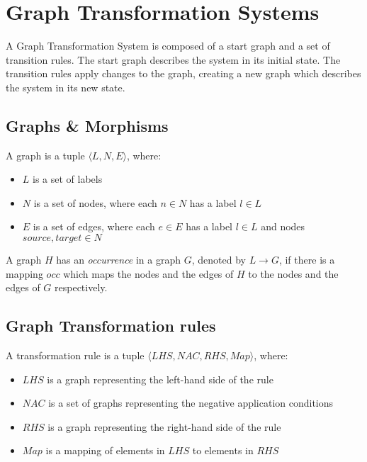 \section{Graph Transformation Systems}\label{sec:graph}
A Graph Transformation System is composed of a start graph and a set of transition rules. The start graph describes the system in its initial state. The transition rules apply changes to the graph, creating a new graph which describes the system in its new state. 

\subsection{Graphs \& Morphisms}
A graph is a tuple $\langle L, N, E\rangle$, where:
\begin{itemize}
  \item $L$ is a set of labels
  \item $N$ is a set of nodes, where each $n \in N$ has a label $l \in L$
  \item $E$ is a set of edges, where each $e \in E$ has a label $l \in L$ and nodes $source,target \in N$
\end{itemize}


A graph $H$ has an \textit{occurrence} in a graph $G$, denoted by $L \rightarrow G$, if there is a mapping $occ$ which maps the nodes and the edges of $H$ to the nodes and the edges of $G$ respectively.

\subsection{Graph Transformation rules}
A transformation rule is a tuple $\langle \mathit{LHS}, \mathit{NAC}, \mathit{RHS}, \mathit{Map}\rangle$, where:
\begin{itemize}
  \item $\mathit{LHS}$ is a graph representing the left-hand side of the rule
  \item $\mathit{NAC}$ is a set of graphs representing the negative application conditions
  \item $\mathit{RHS}$ is a graph representing the right-hand side of the rule
  \item $\mathit{Map}$ is a mapping of elements in $\mathit{LHS}$ to elements in $\mathit{RHS}$
\end{itemize}

